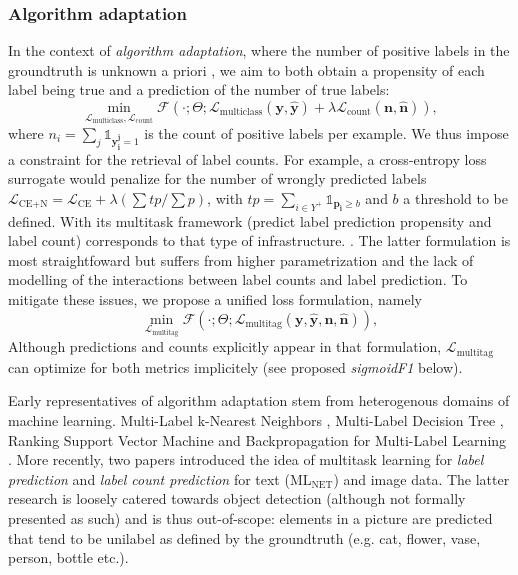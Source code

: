 \subsubsection{Algorithm adaptation}
In the context of \emph{algorithm
adaptation}, where the number of positive labels in the groundtruth is unknown
a priori , we aim to
both obtain a propensity of each label being true and a prediction of the
number of true labels:
%
\begin{equation}
\underset{\mathcal{L}_{\text {multiclass}}, \mathcal{L}_{\text {count}}}
{\min} \mathcal{F}\left(\cdot ; \Theta; \mathcal{L}_{\text {multiclass}}
(\mathbf{y}, \hat{\mathbf{y}}) + \lambda \mathcal{L}_{\text {count}}
(\mathbf{n}, \hat{\mathbf{n}})\right),
\end{equation}
%
where \(n_i = \sum_j \mathds{1}_{\mathbf{y_i^j} = 1}\) is the count of
positive labels per example. We thus impose a constraint for the retrieval of
label counts. For example, a cross-entropy loss surrogate  would penalize for the number of wrongly predicted
labels \(\mathcal{L}_{\text {CE+N}}= \mathcal{L}_{\text {CE}} + \lambda (\sum
tp / \sum p)\), with \(t p=\sum_{i \in Y^{+}} \mathds{1}_{\mathbf{p_i} \geq
b}\) and \(b\) a threshold to be defined. With its multitask framework
(predict label prediction propensity and label count) \cite{multitaskLabel}
corresponds to that type of infrastructure. . The latter
formulation is most straightfoward but suffers from higher parametrization and
the lack of modelling of the interactions between label counts and label
prediction. To mitigate these issues, we propose a unified loss formulation,
namely
%
\begin{equation}
\underset{\mathcal{L}_{\text {multitag}}} {\min} \mathcal{F}\left(\cdot ;
\Theta; \mathcal{L}_{\text {multitag}} (\mathbf{y}, \hat{\mathbf{y}},
\mathbf{n}, \hat{\mathbf{n}}) \right),
\end{equation}
%
Although predictions and counts explicitly appear in that formulation,
\(\mathcal{L}_{\text {multitag}}\) can optimize for both metrics implicitely
(see proposed \emph{sigmoidF1} below).

Early representatives of algorithm adaptation stem from heterogenous
domains of machine learning. Multi-Label k-Nearest Neighbors \cite{ML-KNN},
Multi-Label Decision Tree \cite{ML-DT}, Ranking Support Vector Machine
\cite{multilabelSVM} and Backpropagation for Multi-Label Learning
\cite{multilabelBackprop}. More recently, two papers introduced the idea of
multitask learning for \emph{label prediction} and \emph{label count
prediction} for text (ML\(_{\text{NET}}\)) \cite{multitaskLabel} and image
\cite{multitaskLabelImages} data. The latter research is loosely catered
towards object detection (although not formally presented as such) and is thus
out-of-scope: elements in a picture are predicted that tend to be unilabel as
defined by the groundtruth (e.g. cat, flower, vase, person, bottle etc.).

